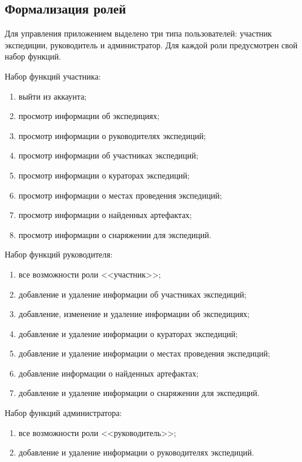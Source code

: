 \subsection{Формализация ролей}
Для управления приложением выделено три типа пользователей: участник экспедиции, руководитель и администратор. Для каждой роли предусмотрен свой набор функций.

Набор функций участника:

\begin{enumerate}[left=0.49cm, label*=---]
        \item выйти из аккаунта;
        \item просмотр информации об экспедициях;
        \item просмотр информации о руководителях экспедиций;
        \item просмотр информации об участниках экспедиций;
        \item просмотр информации о кураторах экспедиций;
        \item просмотр информации о местах проведения экспедиций;
        \item просмотр информации о найденных артефактах;
        \item просмотр информации о снаряжении для экспедиций.
\end{enumerate}

Набор функций руководителя:

\begin{enumerate}[left=0.49cm, label*=---]
        \item все возможности роли <<участник>>;
        \item добавление и удаление информации об участниках экспедиций;
        \item добавление, изменение и удаление информации об экспедициях;
        \item добавление и удаление информации о кураторах экспедиций;
        \item добавление и удаление информации о местах проведения экспедиций;
        \item добавление информации о найденных артефактах;
        \item добавление и удаление информации о снаряжении для экспедиций.
\end{enumerate}

Набор функций администратора:

\begin{enumerate}[left=0.49cm, label*=---]
        \item все возможности роли <<руководитель>>;
        \item добавление и удаление информации о руководителях экспедиций.
\end{enumerate}

